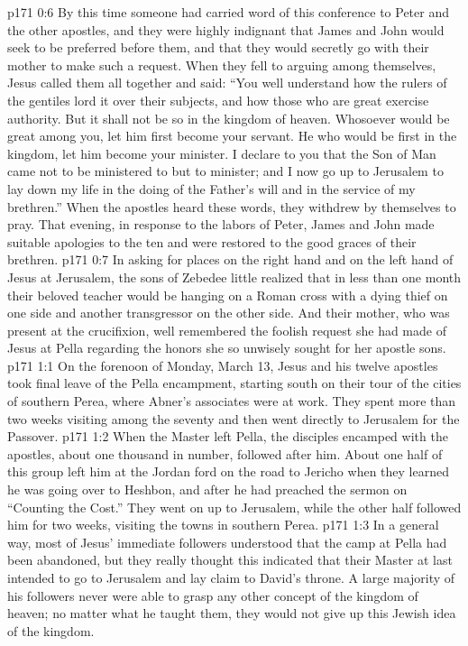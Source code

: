\vs p171 0:6 By this time someone had carried word of this conference to Peter and the other apostles, and they were highly indignant that James and John would seek to be preferred before them, and that they would secretly go with their mother to make such a request. When they fell to arguing among themselves, Jesus called them all together and said: \textcolor{ubdarkred}{“You well understand how the rulers of the gentiles lord it over their subjects, and how those who are great exercise authority. But it shall not be so in the kingdom of heaven. Whosoever would be great among you, let him first become your servant. He who would be first in the kingdom, let him become your minister. I declare to you that the Son of Man came not to be ministered to but to minister; and I now go up to Jerusalem to lay down my life in the doing of the Father’s will and in the service of my brethren.”} When the apostles heard these words, they withdrew by themselves to pray. That evening, in response to the labors of Peter, James and John made suitable apologies to the ten and were restored to the good graces of their brethren.
\vs p171 0:7 In asking for places on the right hand and on the left hand of Jesus at Jerusalem, the sons of Zebedee little realized that in less than one month their beloved teacher would be hanging on a Roman cross with a dying thief on one side and another transgressor on the other side. And their mother, who was present at the crucifixion, well remembered the foolish request she had made of Jesus at Pella regarding the honors she so unwisely sought for her apostle sons.
\vs p171 1:1 On the forenoon of Monday, March 13, Jesus and his twelve apostles took final leave of the Pella encampment, starting south on their tour of the cities of southern Perea, where Abner’s associates were at work. They spent more than two weeks visiting among the seventy and then went directly to Jerusalem for the Passover.
\vs p171 1:2 When the Master left Pella, the disciples encamped with the apostles, about one thousand in number, followed after him. About one half of this group left him at the Jordan ford on the road to Jericho when they learned he was going over to Heshbon, and after he had preached the sermon on “Counting the Cost.” They went on up to Jerusalem, while the other half followed him for two weeks, visiting the towns in southern Perea.
\vs p171 1:3 In a general way, most of Jesus’ immediate followers understood that the camp at Pella had been abandoned, but they really thought this indicated that their Master at last intended to go to Jerusalem and lay claim to David’s throne. A large majority of his followers never were able to grasp any other concept of the kingdom of heaven; no matter what he taught them, they would not give up this Jewish idea of the kingdom.
